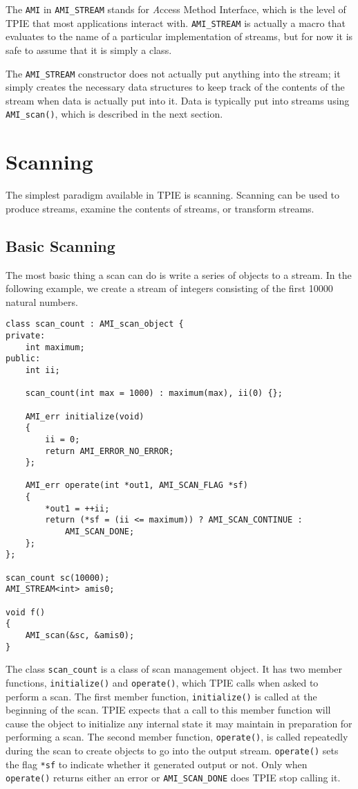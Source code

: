 The {\tt AMI} in {\tt AMI\_STREAM} stands for {\emph Access Method
Interface}, which is the level of TPIE that
most applications interact with. {\tt AMI\_STREAM} is actually a macro that
evaluates to the name of a particular implementation of streams, but for
now it is safe to assume that it is simply a class.

The {\tt AMI\_STREAM} constructor does not actually put anything into
the stream; it simply creates the necessary data structures to keep
track of the contents of the stream when data is actually put into it.
Data is typically put into streams using \verb|AMI_scan()|, which is
described in the next section.

\section{Scanning}
\label{sec:scanning}

 
The simplest paradigm available in TPIE is scanning.  Scanning can be
used to produce streams, examine the contents of streams, or transform
streams.  

\subsection{Basic Scanning}

The most basic thing a scan can do is write a series of objects to a
stream.  In the following example, we create a stream of integers
consisting of the first 10000 natural numbers.

\begin{verbatim}
class scan_count : AMI_scan_object {
private:
    int maximum;
public:
    int ii;

    scan_count(int max = 1000) : maximum(max), ii(0) {};

    AMI_err initialize(void) 
    {
        ii = 0;
        return AMI_ERROR_NO_ERROR;
    };

    AMI_err operate(int *out1, AMI_SCAN_FLAG *sf)
    {
        *out1 = ++ii;
        return (*sf = (ii <= maximum)) ? AMI_SCAN_CONTINUE : 
            AMI_SCAN_DONE;
    };
};

scan_count sc(10000);
AMI_STREAM<int> amis0;    

void f()
{
    AMI_scan(&sc, &amis0);
}
\end{verbatim}

The class \verb|scan_count| is a class of scan management
object.  It has two member
functions, \verb|initialize()| and \verb|operate()|, which TPIE calls
when asked to perform a scan.  The first member function,
\verb|initialize()| is called at the beginning of the scan.  TPIE
expects that a call to this member function will cause the object to
initialize any internal state it may maintain in preparation for
performing a scan.  The second member function, \verb|operate()|, is
called repeatedly during the scan to create objects to go into the
output stream.  \verb|operate()| sets the flag \verb|*sf| to indicate
whether it generated output or not.  Only when \verb|operate()|
returns either an error or \verb|AMI_SCAN_DONE| does TPIE stop calling
it.

